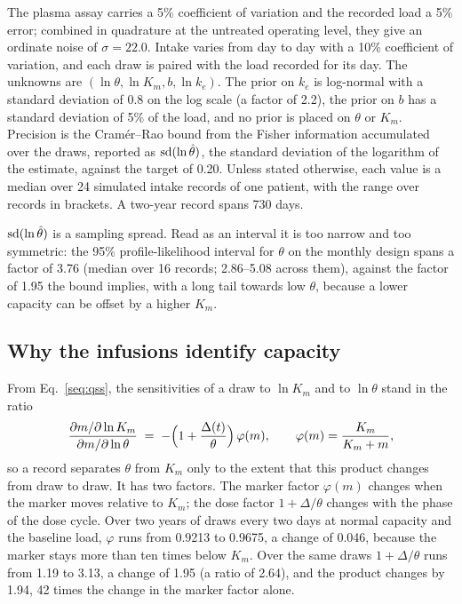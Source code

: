 The plasma assay carries a 5\% coefficient of variation and the recorded load a 5\% error;
combined in quadrature at the untreated operating level, they give an ordinate noise of
$\sigma=22.0$\um. Intake varies from day to day with a 10\%
coefficient of variation, and each draw is paired with the load recorded for its day. The
unknowns are $(\ln\theta,\ln K_m,b,\ln k_e)$. The prior on $k_e$ is log-normal with a standard
deviation of 0.8 on the log scale (a factor of 2.2), the prior on $b$ has a standard deviation of
5\% of the load, and no prior is placed on $\theta$ or $K_m$. Precision is the Cram\'er--Rao
bound from the Fisher information accumulated over the draws, reported as
$\operatorname{sd}(\ln \hat\theta)$, the standard deviation of the logarithm of the estimate, against the target
of 0.20. Unless stated otherwise, each value is a median over 24 simulated intake records of one
patient, with the range over records in brackets. A two-year record spans 730 days.

$\operatorname{sd}(\ln \hat\theta)$ is a sampling spread. Read as an interval it is too narrow and too symmetric:
the 95\% profile-likelihood interval for $\theta$ on the monthly design spans a factor of 3.76
(median over 16 records; 2.86--5.08 across them), against the factor of 1.95 the bound implies,
with a long tail towards low $\theta$, because a lower capacity can be offset by a higher $K_m$.

\subsection{Why the infusions identify capacity}
\label{si:s2:excitation}

From Eq.~\eqref{seq:qss}, the sensitivities of a draw to $\ln K_m$ and to $\ln\theta$ stand in
the ratio
\begin{equation}
\label{seq:ratio}
\frac{\partial m/\partial\ln K_m}{\partial m/\partial\ln\theta}
\;=\;-\Bigl(1+\frac{\Delta(t)}{\theta}\Bigr)\,\varphi(m),
\qquad \varphi(m)=\frac{K_m}{K_m+m},
\end{equation}
so a record separates $\theta$ from $K_m$ only to the extent that this product changes from draw
to draw. It has two factors. The marker factor $\varphi(m)$ changes when the marker moves relative
to $K_m$; the dose factor $1+\Delta/\theta$ changes with the phase of the dose cycle. Over two
years of draws every two days at normal capacity and the baseline load, $\varphi$ runs from
0.9213 to 0.9675, a change
of 0.046, because the marker stays more than ten times below $K_m$. Over the same draws
$1+\Delta/\theta$ runs from 1.19 to 3.13, a change of 1.95 (a ratio of 2.64), and the product
changes by 1.94, 42 times the change in the marker factor alone.

